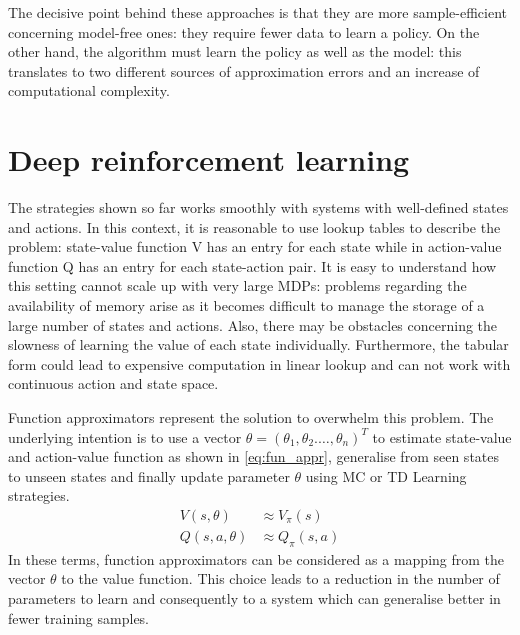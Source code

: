 The decisive point behind these approaches is that they are more sample-efficient concerning model-free ones: they require fewer data to learn a policy. On the other hand, the algorithm must learn the policy as well as the model: this translates to two different sources of approximation errors and an increase of computational complexity.

\section{Deep reinforcement learning} \label{deepreinflearn}



The strategies shown so far works smoothly with systems with well-defined states and actions. In this context, it is reasonable to use lookup tables to describe the problem: state-value function V has an entry for each state while in action-value function Q has an entry for each state-action pair.
It is easy to understand how this setting cannot scale up with very large MDPs: problems regarding the availability of memory arise as it becomes difficult to manage the storage of a large number of states and actions. Also, there may be obstacles concerning the slowness of learning the value of each state individually. Furthermore, the tabular form could lead to expensive computation in linear lookup and can not work with continuous action and state space.

Function approximators represent the solution to overwhelm this problem. The underlying intention is to use a vector $\theta = (\theta_1, \theta_2. \dots, \theta_n)^T$ to estimate state-value and action-value function as shown in \vref{eq:fun_appr}, generalise from seen states to unseen states and finally update parameter $\theta$ using MC or TD Learning strategies.
\begin{equation}\label{eq:fun_appr}
\begin{aligned}
V(s, \theta) &\approx V_\pi(s) \\
Q(s, a, \theta) &\approx Q_\pi(s,a)
\end{aligned}	
\end{equation}
In these terms, function approximators can be considered as a mapping from the vector $\theta$ to the value function.
This choice leads to a reduction in the number of parameters to learn and consequently to a system which can generalise better in fewer training samples.

